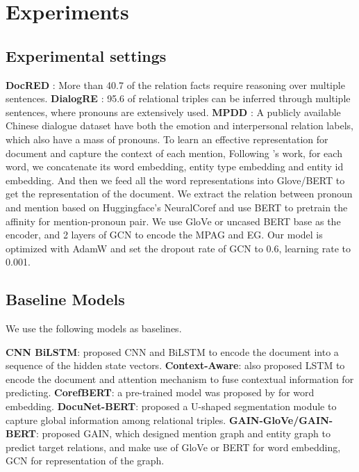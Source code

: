 \documentclass{article}
\begin{document}
\section{Experiments}
\subsection{Experimental settings}

\textbf{DocRED} \cite{yao2019docred}: More than 40.7 of the relation facts require reasoning over multiple sentences. \textbf{DialogRE} \cite{yu2020dialogue}: 95.6 of relational triples can be inferred through multiple sentences, where pronouns are extensively used. \textbf{MPDD} \cite{chen2020mpdd}: A publicly available Chinese dialogue dataset have both the emotion and interpersonal relation labels, which also have a mass of pronouns.
To learn an effective representation for document and capture the context of each mention, Following \cite{yao2019docred}’s work, for each word, we concatenate its word embedding, entity type embedding and entity id embedding. And then we feed all the word representations into Glove/BERT to get the representation of the document. We extract the relation between pronoun and mention based on Huggingface’s NeuralCoref and use BERT to pretrain the affinity for mention-pronoun pair. We 
use GloVe or uncased BERT base as the encoder, and 2 layers of GCN to encode the MPAG and EG. Our model is optimized with AdamW \cite{loshchilov2017decoupled} and set the dropout rate of GCN to 0.6, learning rate to 0.001.
\subsection{Baseline Models}
We use the following models as baselines.

\textbf{CNN  BiLSTM}: \cite{yao2019docred} proposed CNN and BiLSTM to encode the document into a sequence of the hidden state vectors. \textbf{Context-Aware}: \cite{yao2019docred} also proposed LSTM to encode the document and attention mechanism to fuse contextual information for predicting. \textbf{CorefBERT}: a pre-trained model was proposed by \cite{ye2020coreferential} for word embedding. \textbf{DocuNet-BERT}: \cite{zhang2021document} proposed a U-shaped segmentation module to capture global information among relational triples.
\textbf{GAIN-GloVe/GAIN-BERT}: \cite{zeng2020double} proposed GAIN, which designed mention graph and entity graph to predict target relations, and make use of GloVe or BERT for word embedding, GCN for representation of the graph. 
\end{document}
